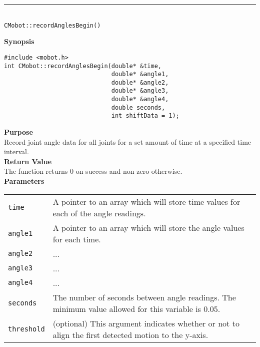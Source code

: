 \noindent
\vspace{5pt}
\rule{4.5in}{0.015in}\\
\noindent
{\LARGE \texttt{CMobot::recordAnglesBegin()}}\\
{}

\noindent
{\bf Synopsis}
\vspace{-8pt}
\begin{verbatim}
#include <mobot.h>
int CMobot::recordAnglesBegin(double* &time, 
                              double* &angle1, 
                              double* &angle2, 
                              double* &angle3, 
                              double* &angle4, 
                              double seconds,
                              int shiftData = 1);
\end{verbatim}

\noindent
{\bf Purpose}\\
Record joint angle data for all joints for a set amount of time at a specified time interval.\\

\noindent
{\bf Return Value}\\
The function returns 0 on success and non-zero otherwise.\\

\noindent
{\bf Parameters}\\
\vspace{-0.1in}
\begin{description}
\item               
\begin{tabular}{p{15 mm}p{145 mm}}
\texttt{time} & A pointer to an array which will store time values for each of the angle readings. \\
\texttt{angle1} & A pointer to an array which will store the angle values for each time. \\
\texttt{angle2} & ... \\
\texttt{angle3} & ... \\
\texttt{angle4} & ... \\
\texttt{seconds} & The number of seconds between angle readings. The minimum value allowed for
this variable is 0.05. \\
\texttt{threshold} & (optional) This argument indicates whether or not to align the first
detected motion to the y-axis. 
\end{tabular}
\end{description}

